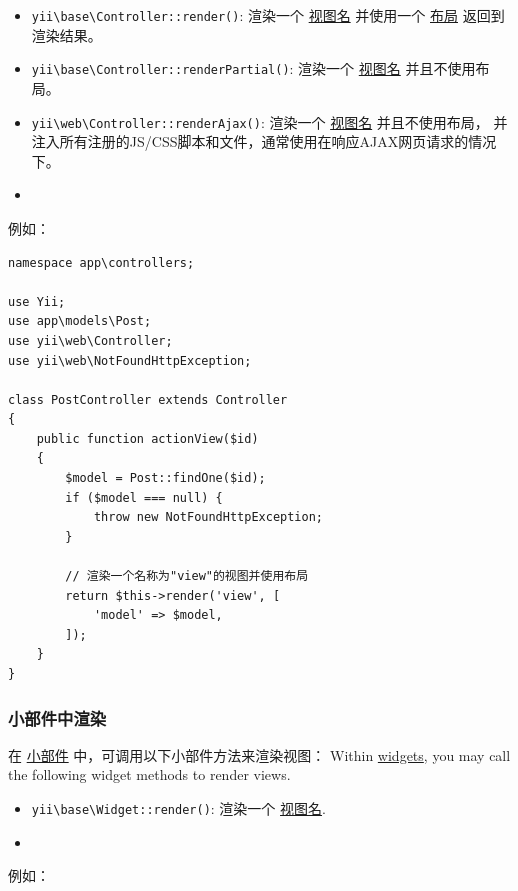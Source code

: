 \begin{itemize}
\item \texttt{yii{\allowbreak{}\textbackslash}base{\allowbreak{}\textbackslash}Controller\allowbreak{}::\allowbreak{}render()}: 渲染一个 \hyperref[structure-views.md::::named-views]{视图名} 并使用一个 \hyperref[structure-views.md::::layouts]{布局}
返回到渲染结果。
\item \texttt{yii{\allowbreak{}\textbackslash}base{\allowbreak{}\textbackslash}Controller\allowbreak{}::\allowbreak{}renderPartial()}: 渲染一个 \hyperref[structure-views.md::::named-views]{视图名} 并且不使用布局。
\item \texttt{yii{\allowbreak{}\textbackslash}web{\allowbreak{}\textbackslash}Controller\allowbreak{}::\allowbreak{}renderAjax()}: 渲染一个 \hyperref[structure-views.md::::named-views]{视图名} 并且不使用布局，
并注入所有注册的JS/CSS脚本和文件，通常使用在响应AJAX网页请求的情况下。
\item 
\end{itemize}
例如：

\lstset{language=php}\begin{lstlisting}
namespace app\controllers;

use Yii;
use app\models\Post;
use yii\web\Controller;
use yii\web\NotFoundHttpException;

class PostController extends Controller
{
    public function actionView($id)
    {
        $model = Post::findOne($id);
        if ($model === null) {
            throw new NotFoundHttpException;
        }

        // 渲染一个名称为"view"的视图并使用布局
        return $this->render('view', [
            'model' => $model,
        ]);
    }
}
\end{lstlisting}
\subsubsection{小部件中渲染 \label{structure-views.md::rendering-in-widgets}}
在 \hyperref[structure-widgets.md]{小部件} 中，可调用以下小部件方法来渲染视图：
Within \hyperref[structure-widgets.md]{widgets}, you may call the following widget methods to render views.

\begin{itemize}
\item \texttt{yii{\allowbreak{}\textbackslash}base{\allowbreak{}\textbackslash}Widget\allowbreak{}::\allowbreak{}render()}: 渲染一个 \hyperref[structure-views.md::::named-views]{视图名}.
\item 
\end{itemize}
例如：

